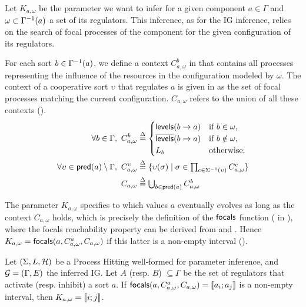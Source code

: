 Let $K_{a,\omega}$ be the parameter we want to infer for a given component $a \in \Gamma$
and $\omega \subset \Gamma^{-1}(a)$ a set of its regulators.
This inference, as for the IG inference, relies on the search of focal processes of the component for the given configuration of its regulators.

For each sort $b \in \Gamma^{-1}(a)$, we define a context $C^b_{a,\omega}$ in  that contains all processes representing the influence of the resources in the configuration modeled by $\omega$.
The context of a cooperative sort $\upsilon$ that regulates $a$ is given in
 as the set of focal processes matching the current configuration.
$C_{a,\omega}$ refers to the union of all these contexts ().
\begin{align}
  \label{eq:param_context}
  \forall b\in\Gamma,~
  C_{a,\omega}^b & \stackrel{\Delta}= \begin{cases}
    \mathsf{levels}(b\rightarrow a) & \text{if $b \in \omega$,}\\
    \overline{\mathsf{levels}}(b\rightarrow a) & \text{if $b \notin \omega$,}\\
    L_b            & \text{otherwise;}\\
  \end{cases}
  \\
  \label{eq:param_context_coop}
  \forall \upsilon \in \mathsf{pred}(a)\setminus\Gamma,~
  C_{a,\omega}^\upsilon & \stackrel{\Delta}= \{
  \upsilon(\sigma) \mid \sigma \in \textstyle\prod_{c\in\Sigma^{-1}(\upsilon)}C_{a,\omega}^c \}
  \\
  C_{a,\omega} & \stackrel{\Delta}= \textstyle\bigcup_{b\in\mathsf{pred}(a)} C^b_{a,\omega}
  \label{eq:K-ctx}
\end{align}

The parameter $K_{a,\omega}$ specifies to which values $a$ eventually evolves as long as the context
$C_{a,\omega}$ holds, which is precisely the definition of the $\mathsf{focals}$ function
( in ),
where the focals reachability property can be derived from  and
.
Hence $K_{a,\omega} = \mathsf{focals}(a,C^a_{a,\omega},C_{a,\omega})$ if this latter is a non-empty interval
().

\begin{proposition}
\label{pps:param_K}
Let $(\Sigma, L, \mathcal{H})$ be a Process Hitting well-formed for parameter inference, and $\mathcal{G} = (\Gamma, E)$ the inferred IG.
Let $A$ (resp. $B$) $\subseteq \Gamma$ be the set of regulators that activate (resp. inhibit) a sort
$a$.
If $\mathsf{focals}(a,C^a_{a,\omega},C_{a,\omega})=\llbracket a_i ; a_j \rrbracket$ is a non-empty interval, then $K_{a,\omega} = \llbracket i ; j \rrbracket$.
\end{proposition}

